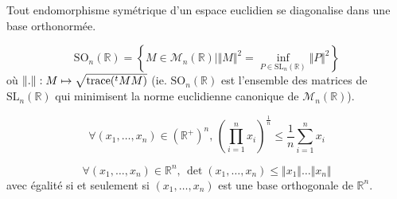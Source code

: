   \begin{application}
    Tout endomorphisme symétrique d'un espace euclidien se diagonalise dans une base orthonormée.
  \end{application}


  \begin{application}
    \[ \mathrm{SO}_n(\mathbb{R}) = \left\{ M \in \mathcal{M}_n(\mathbb{R}) \mid \Vert M \Vert^2 = \inf_{P \in \mathrm{SL}_n(\mathbb{R})} \Vert P \Vert^2 \right\} \]
    où $\Vert . \Vert : M \mapsto \sqrt{\operatorname{trace}(\mathstrut ^t MM)}$ (ie. $\mathrm{SO}_n(\mathbb{R})$ est l'ensemble des matrices de $\mathrm{SL}_n(\mathbb{R})$ qui minimisent la norme euclidienne canonique de $\mathcal{M}_n(\mathbb{R})$).
  \end{application}


  \begin{application}
    \[ \forall (x_1, \dots, x_n) \in (\mathbb{R}^+)^n, \, \left( \prod_{i=1}^{n} x_i \right)^{\frac{1}{n}} \leq \frac{1}{n} \sum_{i=1}^n x_i \]
  \end{application}


  \begin{application}
    \[ \forall (x_1, \dots, x_n) \in \mathbb{R}^n, \, \det(x_1, \dots, x_n) \leq \Vert x_1 \Vert \dots \Vert x_n \Vert \]
    avec égalité si et seulement si $(x_1, \dots, x_n)$ est une base orthogonale de $\mathbb{R}^n$.
  \end{application}

  \annexessection


